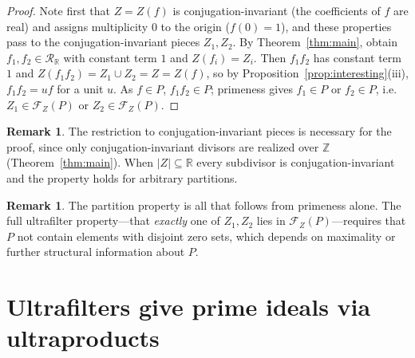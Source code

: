 \documentclass[12pt]{amsart}
\theoremstyle{definition}
\newtheorem{remark}[theorem]{Remark}
\newcommand{\Z}{\mathbb{Z}}
\newcommand{\R}{\mathbb{R}}
\newcommand{\mRR}{\mathcal{R}_{\mathbb{R}}}
\begin{document}
\begin{proof}
Note first that $Z = Z(f)$ is conjugation-invariant (the coefficients of
$f$ are real) and assigns multiplicity $0$ to the origin ($f(0) = 1$),
and these properties pass to the conjugation-invariant pieces $Z_1,
Z_2$.  By Theorem~\ref{thm:main}, obtain $f_1, f_2 \in \mRR$ with
constant term $1$ and $Z(f_i) = Z_i$.  Then $f_1 f_2$ has constant term
$1$ and $Z(f_1 f_2) = Z_1 \cup Z_2 = Z = Z(f)$, so by
Proposition~\ref{prop:interesting}(iii), $f_1 f_2 = u f$ for a unit $u$.
As $f \in P$, $f_1 f_2 \in P$; primeness gives $f_1 \in P$ or $f_2 \in
P$, i.e.\ $Z_1 \in \mathcal{F}_Z(P)$ or $Z_2 \in \mathcal{F}_Z(P)$.
\end{proof}

\begin{remark}
The restriction to conjugation-invariant pieces is necessary for the
proof, since only conjugation-invariant divisors are realized over $\Z$
(Theorem~\ref{thm:main}).  When $|Z|
\subseteq \R$ every subdivisor is conjugation-invariant and the property
holds for arbitrary partitions.
\end{remark}

\begin{remark}
The partition property is all that follows from primeness alone.  The
full ultrafilter property---that \emph{exactly} one of $Z_1, Z_2$ lies in
$\mathcal{F}_Z(P)$---requires that $P$ not contain elements with disjoint
zero sets, which depends on maximality or further structural information
about $P$.
\end{remark}

\section{Ultrafilters give prime ideals via ultraproducts}
\label{sec:ultra}
\end{document}
